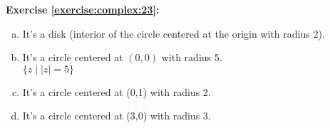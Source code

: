\noindent\textbf{Exercise \ref{exercise:complex:23}:}  %
\begin{enumerate}[(a)]
\item
It's a disk (interior of the circle centered at the origin with radius 2).
\begin{figure}[H]
\begin{center}
\end{center}
\end{figure}

\item
It's a circle centered at $(0,0)$ with radius 5.\\
$\{z \mid |z| = 5\}$

\item
It's a circle centered at (0,1) with radius 2.

\item
It's a circle centered at (3,0) with radius 3.
\end{enumerate}

